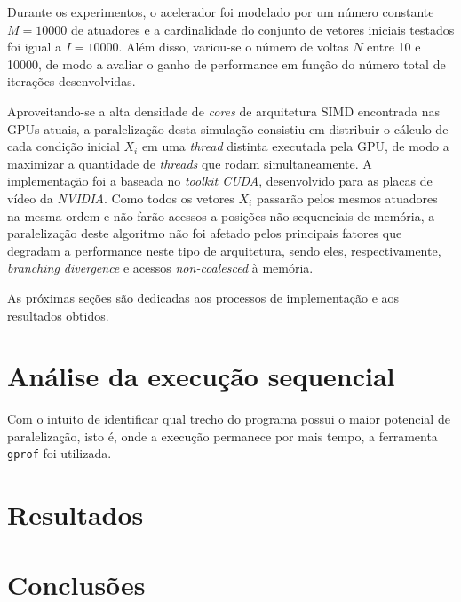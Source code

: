 \documentclass[12pt]{article}
\begin{document}
Durante os experimentos, o acelerador foi modelado por um número
constante \(M = 10000\) de atuadores e a cardinalidade do conjunto de vetores
iniciais testados foi igual a \(I = 10000\). Além disso, variou-se o número de
voltas \(N\) entre 10 e 10000, de modo a avaliar o ganho de performance em
função do número total de iterações desenvolvidas.

Aproveitando-se a alta densidade de \textit{cores} de arquitetura SIMD
encontrada nas GPUs atuais, a paralelização desta simulação consistiu em
distribuir o cálculo de cada condição inicial \(X_i\) em uma \textit{thread}
distinta executada pela GPU, de modo a maximizar a quantidade de
\textit{threads} que rodam simultaneamente. A implementação foi a baseada no
\textit{toolkit CUDA}, desenvolvido para as placas de vídeo da \textit{NVIDIA}.
Como todos os vetores \(X_i\) passarão pelos mesmos atuadores na mesma ordem e
não farão acessos a posições não sequenciais de memória, a paralelização deste
algoritmo não foi afetado pelos principais fatores que degradam a performance
neste tipo de arquitetura, sendo eles, respectivamente, \textit{branching
divergence} e acessos \textit{non-coalesced} à memória.

As próximas seções são dedicadas aos processos de implementação e aos resultados
obtidos.


\section {Análise da execução sequencial}

Com o intuito de identificar qual trecho do programa possui o maior potencial de
paralelização, isto é, onde a execução permanece por mais tempo, a ferramenta
\texttt{gprof} foi utilizada.

\section{Resultados}



\section{Conclusões}





\end{document}
